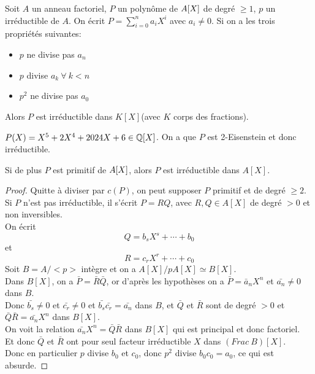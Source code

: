 \begin{theorem}
	Soit $A$ un anneau factoriel, $P$ un polynôme  de $A[X]$ de degré $\geq 1$, $p$ un irréductible de $A$.
	On écrit $P = \sum\limits_{i=0}^n a_iX^i$ avec $a_i \neq 0$. Si on a les trois propriétés suivantes:
	\begin{itemize}
		\item $p$ ne divise pas $a_n$
		\item $p$ divise $a_k \ \forall \ k < n$
		\item $p^2$ ne divise pas $a_0$
	\end{itemize}
	Alors $P$ est irréductible dans $K[X]$(avec $K$ corps des fractions).
\end{theorem}

\begin{example}
	$P(X) = X^5 + 2X^4 + 2024X + 6\in \mathbb{Q}[X]$. On a que $P$ est 2-Eisenstein et donc irréductible.
\end{example}

\begin{coro}
	Si de plus $P$ est primitif de $A[X]$, alors $P$ est irréductible dans $A[X]$.
\end{coro}


\begin{proof}
	Quitte à diviser par $c(P)$, on peut supposer $P$ primitif et de degré $\geq 2$.\\
	Si $P$ n'est pas irréductible, il s'écrit $P=RQ$, avec $R, Q \in A[X]$ de degré $>0$ et non inversibles.\\
	On écrit
	$$Q = b_sX^s + \cdots + b_0$$ et $$R = c_rX^r + \cdots + c_0$$
	Soit $B = A/<p>$ intègre et on a $A[X]/pA[X] \simeq B[X]$. \\
	Dans $B[X]$, on a $\bar{P} = \bar{R}\bar{Q}$,
	or d'après les hypothèses on a $\bar{P} = \bar{a}_nX^n$ et $\bar{a_n} \neq 0 $ dans $B$. \\
	Donc $\bar{b_s} \neq 0$ et $\bar{c_r} \neq 0$ et $\bar{b_s}\bar{c_r} = \bar{a_n}$ dans $B$,
	et $\bar{Q}$ et $\bar{R}$ sont de degré $>0$ et $\bar{Q}\bar{R} = \bar{a_n}X^n$ dans $B[X]$. \\
	On voit la relation $\bar{a_n}X^n= \bar{Q}\bar{R}$ dans $B[X]$ qui est principal et donc factoriel. \\
	Et donc $\bar{Q}$ et $\bar{R}$ ont pour seul facteur irréductible $X$ dans $(Frac \ B)[X]$.\\
	Donc en particulier $p$ divise $b_0$ et $c_0$, donc $p^2$ divise $b_0c_0 = a_0$, ce qui est absurde.
\end{proof}


